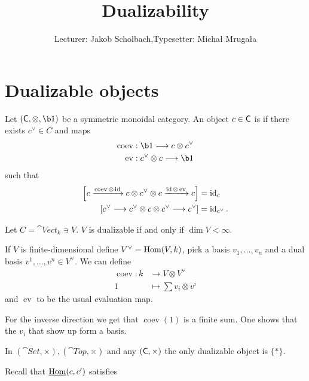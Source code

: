 
\def\coev{\operatorname{coev}}
\def\ev{\operatorname{ev}}
\def\PrL{\cat{Pr}^L}

\title{Dualizability}
\author{Lecturer: Jakob Scholbach,\quad Typesetter: Micha{\l} Mruga{\l}a}


\maketitle

\section{Dualizable objects}
\begin{definition}
	Let $(\C, \otimes, \b1)$ be a symmetric monoidal category. An object $c\in \mathsf{C}$ is  if there exists $c^{\vee}\in C$ and maps
	\begin{align*}
		\coev &: \b1 \to c\otimes c^{\vee} \\
		\ev &: c^{\vee}\otimes c \to \b1
	\end{align*}
	such that
	\begin{align*}
		\left[ c \xrightarrow{\coev \otimes \id} c \otimes c^{\vee}\otimes c \xrightarrow{\id\otimes \ev} c \right] &= \id_{c} \\
		\left[ c^{\vee}\to c^{\vee}\otimes c\otimes c^{\vee}\to c^{\vee} \right] &= \id_{c^{\vee}}
	.\end{align*}
\end{definition}
\begin{example}
	Let $C=\cat{Vect}_k\ni V$. $V$ is dualizable if and only if $\dim V<\infty$.

	If $V$ is finite-dimensional define $V^{\vee} = \operatorname{Hom}(V,k)$, pick a basis $v_1,\dots,v_n$ and a dual basis $v^{1},\dots,v^{n}\in V^{\vee}$. We can define
	\begin{align*}
		\coev: k &\longrightarrow V\otimes V^{\vee} \\
		1 &\longmapsto \sum v_i\otimes v^{i}
	\end{align*}
	and $\ev$ to be the usual evaluation map.

	For the inverse direction we get that $\coev(1)$ is a finite sum. One shows that the $v_i$ that show up form a basis.
\end{example}
\begin{example}
	In $(\cat{Set},\times ), (\cat{Top}, \times )$ and any $(\mathsf{C},\times )$ the only dualizable object is $\{*\} $.
\end{example}
Recall that $\underline{\operatorname{Hom}}(c,c')$ satisfies
